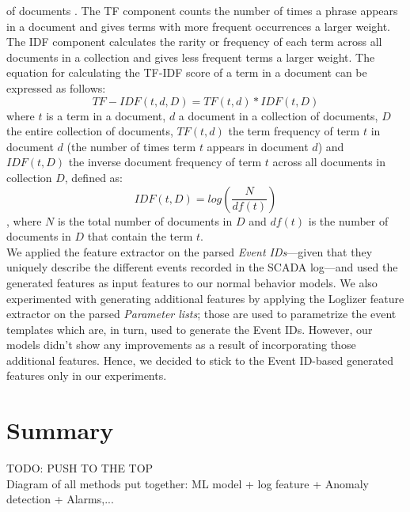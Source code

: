         of documents \cite{tf-idf_review}. The TF component counts the number of times a phrase appears in a document and gives terms with more frequent occurrences a larger weight. 
        The IDF component calculates the rarity or frequency of each term across all documents in a collection and gives less frequent terms a larger weight.
        The equation for calculating the TF-IDF score of a term in a document can be expressed as follows:
        \begin{equation}
          TF-IDF(t,d,D) = TF(t,d) * IDF(t,D)
        \end{equation}
        where $t$ is a term in a document, $d$ a document in a collection of documents, $D$ the entire collection of documents, $TF(t,d)$ the term frequency of term $t$ in document $d$
        (the number of times term $t$ appears in document $d$) and $IDF(t,D)$ the inverse document frequency of term $t$ across all documents in collection $D$, defined as:
        \begin{equation}
          IDF(t,D) = log(\frac{N}{df(t)})
        \end{equation}
        , where $N$ is the total number of documents in $D$ and $df(t)$ is the number of documents in $D$ that contain the term $t$.\\
        We applied the feature extractor on the parsed \emph{Event IDs}---given that they uniquely describe the different events recorded in the SCADA log---and 
        used the generated features as input features to our normal behavior models. We also experimented with generating additional features by applying the Loglizer feature extractor 
        on the parsed \emph{Parameter lists}; those are used to parametrize the event templates which are, in turn, used to generate the Event IDs. 
        However, our models didn't show any improvements as a result of incorporating those additional features. Hence, we decided to stick to the Event ID-based 
        generated features only in our experiments.



\clearpage

\section{Summary}
TODO:
PUSH TO THE TOP\\
Diagram of all methods put together: ML model + log feature + Anomaly detection + Alarms,...

\clearpage